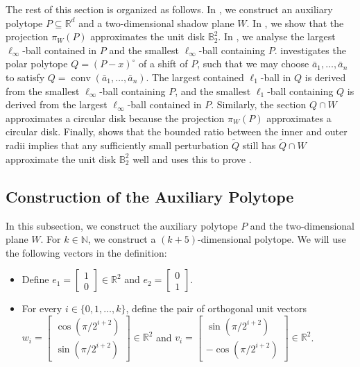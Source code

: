 \documentclass{theoretics}
\newcommand{\R}{\mathbb R}
\newcommand{\N}{\mathbb N}
\newcommand{\conv}{\operatorname{conv}}
\newcommand{\ball}{\mathbb{B}_2}
\renewcommand{\subset}{\subseteq}
\begin{document}
The rest of this section is organized as follows.
In , we construct an auxiliary polytope $P \subset \R^d$ and a two-dimensional shadow plane $W$.
In , we show that the projection $\pi_W(P)$ approximates the unit disk $\ball^2$. 
In , we analyse the largest $\ell_\infty$-ball contained in $P$ and the smallest $\ell_\infty$-ball containing $P$.
 investigates the polar polytope $Q = (P-x)^\circ$ of a shift of $P$, such that we may choose $\bar{a}_1,\dots,\bar{a}_n$
to satisfy $Q = \conv(\bar a_1,\dots,\bar a_n)$.
The largest contained $\ell_1$-ball in $Q$ is derived from the smallest $\ell_\infty$-ball containing $P$,
and the smallest $\ell_1$-ball containing $Q$ is derived from the largest $\ell_\infty$-ball contained in $P$.
Similarly, the section $Q \cap W$ approximates a circular disk because the projection $\pi_W(P)$ approximates a circular disk.
Finally,  shows that the bounded ratio between the inner and outer radii implies that any
sufficiently small perturbation $\tilde Q$ still has $\tilde Q \cap W$ approximate the unit disk $\ball^2$ well
and uses this to prove .


\subsection{Construction of the Auxiliary Polytope}\label{sec:lb-construction}

In this subsection, we construct the auxiliary polytope $P$ and the two-dimensional plane $W$.
For $k \in \N$, we construct a $(k + 5)$-dimensional polytope.
We will use the following vectors in the definition:
\begin{itemize}
    \item Define $e_1 = \begin{bmatrix}1\\ 0 \end{bmatrix} \in \R^2$ and $e_2 = \begin{bmatrix} 0\\ 1 \end{bmatrix}$.
    \item For every $i \in \{0, 1, \ldots, k\}$, define the pair of orthogonal unit vectors $w_i  = \begin{bmatrix}\cos(\pi/2^{i+2}) \\ \sin(\pi/2^{i+2}) \end{bmatrix} \in \R^2$ and $v_i =  \begin{bmatrix}\sin(\pi/2^{i+2}) \\ -\cos(\pi/2^{i+2})\end{bmatrix} \in \R^2$.
\end{itemize}
\end{document}

